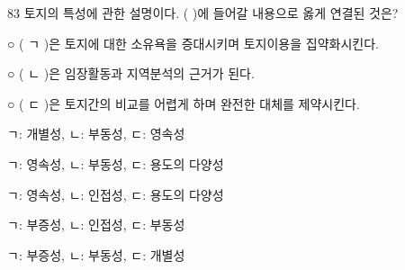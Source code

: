 \begin{question}{83}
토지의 특성에 관한 설명이다. ( )에 들어갈 내용으로 옳게 연결된 것은?
\begin{framedtext}
○ ( ㄱ )은 토지에 대한 소유욕을 증대시키며 토지이용을 집약화시킨다. \par
○ ( ㄴ )은 임장활동과 지역분석의 근거가 된다. \par
○ ( ㄷ )은 토지간의 비교를 어렵게 하며 완전한 대체를 제약시킨다.
\end{framedtext}
\begin{choices}
  \item ㄱ: 개별성, ㄴ: 부동성, ㄷ: 영속성
  \item ㄱ: 영속성, ㄴ: 부동성, ㄷ: 용도의 다양성
  \item ㄱ: 영속성, ㄴ: 인접성, ㄷ: 용도의 다양성
  \item ㄱ: 부증성, ㄴ: 인접성, ㄷ: 부동성
  \item ㄱ: 부증성, ㄴ: 부동성, ㄷ: 개별성
\end{choices}
\end{question}
